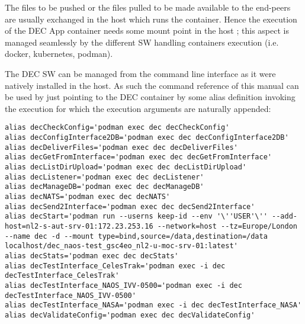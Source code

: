 \documentclass[dec_sum_main.tex]{subfiles}
\begin{document}
\par
\noindent
\newline
The files to be pushed or the files pulled to be made available to the end-peers are usually exchanged in the host which runs the container. Hence the execution of the DEC App container needs some mount point in the host ; this aspect is managed seamlessly by the different SW handling containers execution (i.e. docker, kubernetes, podman).

\par
\noindent
\newline
The DEC SW can be managed from the command line interface as it were natively installed in the host. As such the command reference of this manual can be used by just pointing to the DEC container by some alias definition invoking the execution for which the execution arguments are naturally appended:
\begin{verbatim}
alias decCheckConfig='podman exec dec decCheckConfig'
alias decConfigInterface2DB='podman exec dec decConfigInterface2DB'
alias decDeliverFiles='podman exec dec decDeliverFiles'
alias decGetFromInterface='podman exec dec decGetFromInterface'
alias decListDirUpload='podman exec dec decListDirUpload'
alias decListener='podman exec dec decListener'
alias decManageDB='podman exec dec decManageDB'
alias decNATS='podman exec dec decNATS'
alias decSend2Interface='podman exec dec decSend2Interface'
alias decStart='podman run --userns keep-id --env '\''USER'\'' --add-host=nl2-s-aut-srv-01:172.23.253.16 --network=host --tz=Europe/London --name dec -d --mount type=bind,source=/data,destination=/data localhost/dec_naos-test_gsc4eo_nl2-u-moc-srv-01:latest'
alias decStats='podman exec dec decStats'
alias decTestInterface_CelesTrak='podman exec -i dec decTestInterface_CelesTrak'
alias decTestInterface_NAOS_IVV-0500='podman exec -i dec decTestInterface_NAOS_IVV-0500'
alias decTestInterface_NASA='podman exec -i dec decTestInterface_NASA'
alias decValidateConfig='podman exec dec decValidateConfig'
\end{verbatim}
\end{document}
